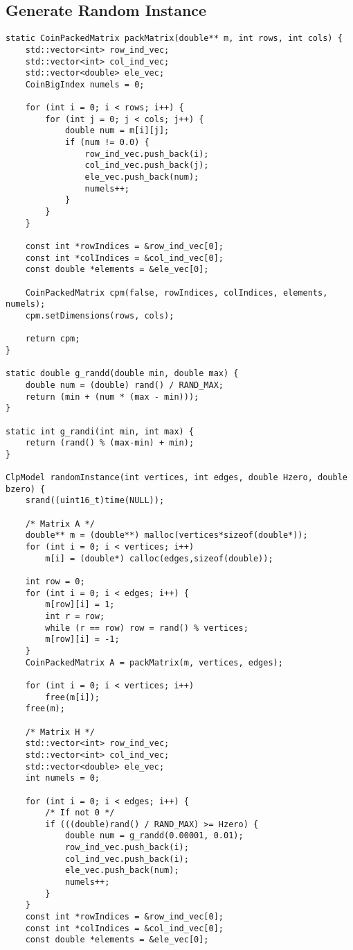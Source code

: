 \subsection{Generate Random Instance}
\label{app:random}
\begin{verbatim}
static CoinPackedMatrix packMatrix(double** m, int rows, int cols) {
    std::vector<int> row_ind_vec;
    std::vector<int> col_ind_vec;
    std::vector<double> ele_vec;
    CoinBigIndex numels = 0;

    for (int i = 0; i < rows; i++) {
        for (int j = 0; j < cols; j++) {
            double num = m[i][j];
            if (num != 0.0) {
                row_ind_vec.push_back(i);
                col_ind_vec.push_back(j);
                ele_vec.push_back(num);
                numels++;
            }   
        }   
    }   

    const int *rowIndices = &row_ind_vec[0];
    const int *colIndices = &col_ind_vec[0];
    const double *elements = &ele_vec[0];

    CoinPackedMatrix cpm(false, rowIndices, colIndices, elements, numels);
    cpm.setDimensions(rows, cols);

    return cpm;
}

static double g_randd(double min, double max) {
    double num = (double) rand() / RAND_MAX;
    return (min + (num * (max - min)));
}

static int g_randi(int min, int max) {
    return (rand() % (max-min) + min);
}

ClpModel randomInstance(int vertices, int edges, double Hzero, double bzero) {
    srand((uint16_t)time(NULL));

    /* Matrix A */
    double** m = (double**) malloc(vertices*sizeof(double*));
    for (int i = 0; i < vertices; i++)
        m[i] = (double*) calloc(edges,sizeof(double));

    int row = 0;
    for (int i = 0; i < edges; i++) {
        m[row][i] = 1;
        int r = row;
        while (r == row) row = rand() % vertices;
        m[row][i] = -1;
    }
    CoinPackedMatrix A = packMatrix(m, vertices, edges);

    for (int i = 0; i < vertices; i++)
        free(m[i]);
    free(m);

    /* Matrix H */
    std::vector<int> row_ind_vec;
    std::vector<int> col_ind_vec;
    std::vector<double> ele_vec;
    int numels = 0;

    for (int i = 0; i < edges; i++) {
        /* If not 0 */
        if (((double)rand() / RAND_MAX) >= Hzero) {
            double num = g_randd(0.00001, 0.01);
            row_ind_vec.push_back(i);
            col_ind_vec.push_back(i);
            ele_vec.push_back(num);
            numels++;
        }
    }
    const int *rowIndices = &row_ind_vec[0];
    const int *colIndices = &col_ind_vec[0];
    const double *elements = &ele_vec[0];


\end{verbatim}
